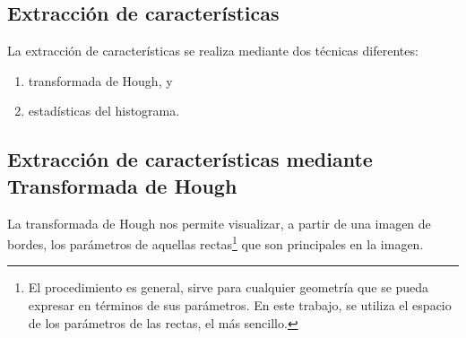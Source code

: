 \documentclass[conference,a4paper,10pt,oneside,final]{tfmpd}
\begin{document}
\subsection{Extracción de características}

La extracción de características se realiza 
mediante dos técnicas diferentes:
\begin{enumerate}
\item {} transformada de Hough, y
\item {} estadísticas del histograma.
\end{enumerate}
%
%
\subsection{Extracción de características mediante Transformada de Hough}
La transformada de Hough nos permite visualizar, a partir de una imagen de
bordes, los parámetros de aquellas rectas\footnote{El procedimiento es general,
sirve para cualquier geometría que se pueda expresar en términos de sus
parámetros. En este trabajo, se utiliza el espacio de los parámetros de las
rectas, el más sencillo.}
que son principales en la imagen.
\end{document}

